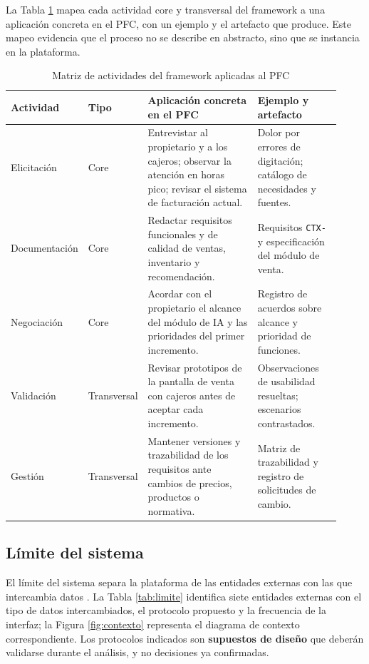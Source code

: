 \documentclass[onecolumn,12pt,a4paper]{IEEEtran}
\begin{document}
La Tabla \ref{tab:framework-pfc} mapea cada actividad core y transversal del framework a una aplicaci\'on concreta en el PFC, con un ejemplo y el artefacto que produce. Este mapeo evidencia que el proceso no se describe en abstracto, sino que se instancia en la plataforma.

\begin{table}[htbp]
\caption{Matriz de actividades del framework aplicadas al PFC}
\label{tab:framework-pfc}
\centering
\footnotesize
\begin{tabular}{@{}p{0.17\linewidth}p{0.10\linewidth}p{0.38\linewidth}p{0.27\linewidth}@{}}
\toprule
\textbf{Actividad} & \textbf{Tipo} & \textbf{Aplicaci\'on concreta en el PFC} & \textbf{Ejemplo y artefacto}\\
\midrule
Elicitaci\'on & Core & Entrevistar al propietario y a los cajeros; observar la atenci\'on en horas pico; revisar el sistema de facturaci\'on actual. & Dolor por errores de digitaci\'on; cat\'alogo de necesidades y fuentes.\\
Documentaci\'on & Core & Redactar requisitos funcionales y de calidad de ventas, inventario y recomendaci\'on. & Requisitos \texttt{CTX-} y especificaci\'on del m\'odulo de venta.\\
Negociaci\'on & Core & Acordar con el propietario el alcance del m\'odulo de IA y las prioridades del primer incremento. & Registro de acuerdos sobre alcance y prioridad de funciones.\\
Validaci\'on & Transversal & Revisar prototipos de la pantalla de venta con cajeros antes de aceptar cada incremento. & Observaciones de usabilidad resueltas; escenarios contrastados.\\
Gesti\'on & Transversal & Mantener versiones y trazabilidad de los requisitos ante cambios de precios, productos o normativa. & Matriz de trazabilidad y registro de solicitudes de cambio.\\
\bottomrule
\end{tabular}
\end{table}

\subsection{L\'imite del sistema}
El l\'imite del sistema separa la plataforma de las entidades externas con las que intercambia datos \cite{pohl2025}. La Tabla \ref{tab:limite} identifica siete entidades externas con el tipo de datos intercambiados, el protocolo propuesto y la frecuencia de la interfaz; la Figura \ref{fig:contexto} representa el diagrama de contexto correspondiente. Los protocolos indicados son \textbf{supuestos de dise\~no} que deber\'an validarse durante el an\'alisis, y no decisiones ya confirmadas.
\end{document}
